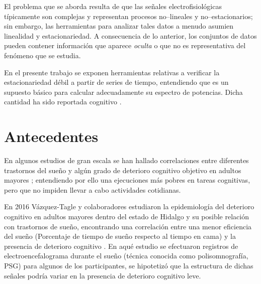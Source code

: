 El problema que se aborda resulta de que las señales electrofisiológicas típicamente son complejas 
y representan procesos no--lineales y no--estacionarios; sin embargo, las herramientas para 
analizar tales datos a menudo asumien linealidad y estacionariedad.
%
A consecuencia de lo anterior, los conjuntos de datos pueden contener información que aparece
\textit{oculta} o que no es representativa del fenómeno que se estudia. 

En el presente trabajo se exponen herramientas relativas a verificar la estacionariedad débil a 
partir de series de tiempo, entendiendo que es un supuesto básico para calcular adecuadamente su 
espectro de potencias.
%
Dicha cantidad ha sido reportada 
cognitivo \cite{Amer13,Miyata13,Reid06,Potvin12}.


\section{Antecedentes}

En algunos estudios de gran escala se han hallado correlaciones entre diferentes trastornos del 
sueño y algún grado de deterioro cognitivo objetivo en adultos mayores 
\cite{Amer13,Miyata13,Reid06,Potvin12}; entendiendo por ello una ejecuciones más pobres en tareas
cognitivas, pero que no impiden llevar a cabo actividades cotidianas.

En 2016 Vázquez-Tagle y colaboradores estudiaron la epidemiología del deterioro cognitivo en 
adultos mayores dentro del estado de Hidalgo y su posible relación con trastornos de sueño, 
encontrando una correlación entre una menor eficiencia del sueño (Porcentaje de tiempo
de sueño respecto al tiempo en cama) y la presencia de deterioro cognitivo \cite{VazquezTagle16}.
%
En aqué estudio se efectuaron registros de electroencefalograma durante el sueño (técnica conocida
como polisomnografía, PSG) para algunos de los participantes, se hipotetizó que la estructura
de dichas señales podría variar en la presencia de deterioro cognitivo leve.


